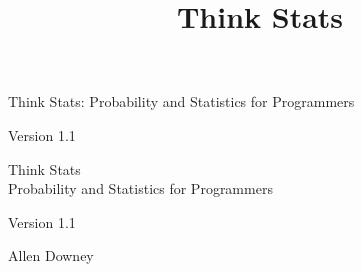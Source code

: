 \documentclass[12pt]{book}
\title{Think Stats}
\newcommand{\theversion}{1.1}
\begin{document}
\frontmatter




\newtheorem{ex}{Exercise}[chapter]

\begin{latexonly}

\renewcommand{\blankpage}{\thispagestyle{empty} \quad \newpage}



\thispagestyle{empty}

\begin{flushright}
\vspace*{2.0in}

\begin{spacing}{3}
{\huge Think Stats: Probability and Statistics for Programmers}\\
{\Large }
\end{spacing}

\vspace{0.25in}

Version \theversion

\vfill

\end{flushright}


\blankpage
\blankpage

\pagebreak
\thispagestyle{empty}

\begin{flushright}
\vspace*{2.0in}

\begin{spacing}{3}
{\huge Think Stats}\\
{\Large Probability and Statistics for Programmers}
\end{spacing}

\vspace{0.25in}

Version \theversion

\vspace{1in}


{\Large
Allen Downey\\
}



\end{flushright}
\end{latexonly}
\end{document}
